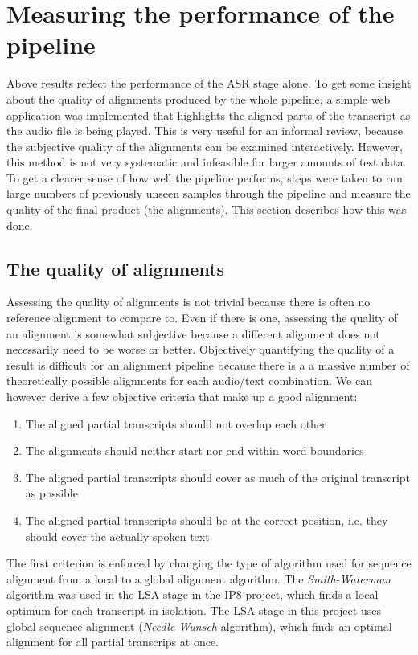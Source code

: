 \section{Measuring the performance of the pipeline}\label{e2e}

Above results reflect the performance of the \ac{ASR} stage alone. To get some insight about the quality of alignments produced by the whole pipeline, a simple web application was implemented that highlights the aligned parts of the transcript as the audio file is being played. This is very useful for an informal review, because the subjective quality of the alignments can be examined interactively. However, this method is not very systematic and infeasible for larger amounts of test data. To get a clearer sense of how well the pipeline performs, steps were taken to run large numbers of previously unseen samples through the pipeline and measure the quality of the final product (the alignments). This section describes how this was done.

\subsection{The quality of alignments}

Assessing the quality of alignments is not trivial because there is often no reference alignment to compare to. Even if there is one, assessing the quality of an alignment is somewhat subjective because a different alignment does not necessarily need to be worse or better. Objectively quantifying the quality of a result is difficult for an alignment pipeline because there is a a massive number of theoretically possible alignments for each audio/text combination. We can however derive a few objective criteria that make up a good alignment:

\begin{enumerate}
	\item The aligned partial transcripts should not overlap each other
	\item The alignments should neither start nor end within word boundaries
	\item The aligned partial transcripts should cover as much of the original transcript as possible	
	\item The aligned partial transcripts should be at the correct position, i.e. they should cover the actually spoken text
\end{enumerate}

The first criterion is enforced by changing the type of algorithm used for sequence alignment from a local to a global alignment algorithm. The \textit{Smith-Waterman} algorithm was used in the \ac{LSA} stage in the IP8 project, which finds a local optimum for each transcript in isolation. The \ac{LSA} stage in this project uses global sequence alignment (\textit{Needle-Wunsch} algorithm), which finds an optimal alignment for all partial transcrips at once. 

